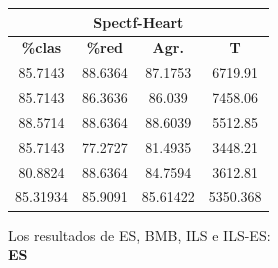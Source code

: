 \documentclass[11pt,a4paper]{article}
\theoremstyle{definition}
\begin{document}
\begin{tabbing}
{		\begin{tabular}{|c|c|c|c|}
			\hline
			\multicolumn{4}{|c|}{\textbf{Spectf-Heart}} \\ \hline
			\textbf{\%clas} & \textbf{\%red} & \textbf{Agr.} & \textbf{T} \\ \hline 
			85.7143	 & 88.6364	&87.1753	 & 6719.91 \\ \hline
85.7143	&  86.3636&	86.039	 & 7458.06 \\ \hline
88.5714	 & 88.6364	&88.6039	 & 5512.85 \\ \hline
85.7143	 & 77.2727	&81.4935	 & 3448.21 \\ \hline
80.8824	 & 88.6364	&84.7594	 & 3612.81 \\ \hline
85.31934&	85.9091	&85.61422	&5350.368 \\ \hline
		\end{tabular}
		}
	\end{tabbing}
	
	Los resultados de ES, BMB, ILS e ILS-ES: ~\\
	
	\textbf{ES}
	
\end{document}
